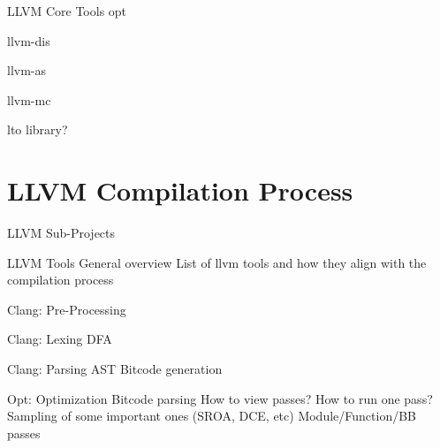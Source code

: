 \documentclass{beamer}
\begin{document}
\begin{frame}{LLVM Core Tools}
    opt

    llvm-dis

    llvm-as

    llvm-mc

    lto library?
\end{frame}


\section{LLVM Compilation Process}


\begin{frame}{LLVM Sub-Projects}
\end{frame}


\begin{frame}{LLVM Tools}
General overview
List of llvm tools and how they align with the compilation process
\end{frame}


\begin{frame}{Clang: Pre-Processing}
\end{frame}


\begin{frame}{Clang: Lexing}
DFA
\end{frame}


\begin{frame}{Clang: Parsing}
AST
Bitcode generation
\end{frame}


\begin{frame}{Opt: Optimization}
Bitcode parsing
How to view passes?
How to run one pass?
Sampling of some important ones (SROA, DCE, etc)
Module/Function/BB passes
\end{frame}
\end{document}
